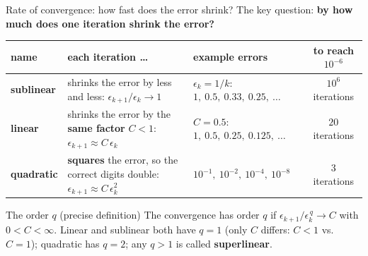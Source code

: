 \documentclass[aspectratio=169]{beamer}
\begin{document}
\begin{frame}{Rate of convergence: how fast does the error shrink?}
\small
The key question: \textbf{by how much does one iteration shrink the error?}
\vspace{0.15cm}
\begin{center}
\footnotesize
\renewcommand{\arraystretch}{1.2}
\begin{tabular}{>{\raggedright\arraybackslash}p{1.8cm} >{\raggedright\arraybackslash}p{4.3cm} >{\raggedright\arraybackslash}p{3.4cm} c}
\toprule
\textbf{name} & \textbf{each iteration \ldots} & \textbf{example errors} & \textbf{to reach $10^{-6}$} \\
\midrule
\textbf{sublinear} & shrinks the error by less and less: $\epsilon_{k+1}/\epsilon_k \to 1$ & $\epsilon_k = 1/k$:\newline $1,\ 0.5,\ 0.33,\ 0.25,\ \ldots$ & $10^{6}$ iterations \\
\textbf{linear} & shrinks the error by the \textbf{same factor} $C < 1$: $\epsilon_{k+1} \approx C\,\epsilon_k$ & $C = 0.5$:\newline $1,\ 0.5,\ 0.25,\ 0.125,\ \ldots$ & $20$ iterations \\
\textbf{quadratic} & \textbf{squares} the error, so the correct digits double: $\epsilon_{k+1} \approx C\,\epsilon_k^{2}$ & $10^{-1},\ 10^{-2},\ 10^{-4},\ 10^{-8}$ & $3$ iterations \\
\bottomrule
\end{tabular}
\end{center}
\vspace{0.1cm}
\begin{block}{The order $q$ (precise definition)}
\footnotesize The convergence has order $q$ if $\epsilon_{k+1} / \epsilon_k^{\,q} \to C$ with $0 < C < \infty$. \quad
Linear and sublinear both have $q = 1$ (only $C$ differs: $C < 1$ vs.\ $C = 1$); quadratic has $q = 2$; any $q > 1$ is called \textbf{superlinear}.
\end{block}
\end{frame}
\end{document}
